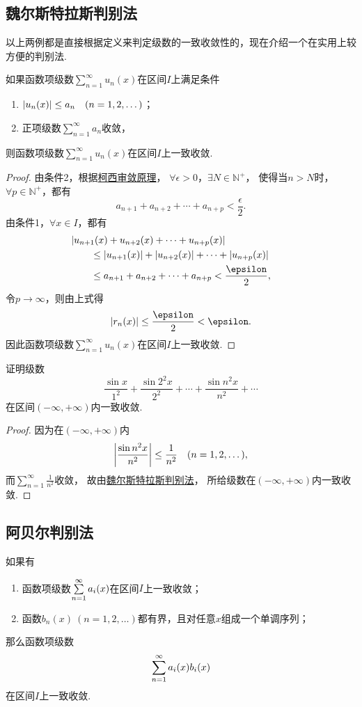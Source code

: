 \subsection{魏尔斯特拉斯判别法}
以上两例都是直接根据定义来判定级数的一致收敛性的，现在介绍一个在实用上较方便的判别法.
\begin{theorem}[魏尔斯特拉斯判别法]\label{theorem:无穷级数.魏尔斯特拉斯判别法}
如果函数项级数\(\sum\limits_{n=1}^\infty u_n(x)\)在区间\(I\)上满足条件\begin{enumerate}
\item \(\abs{u_n(x)} \leq a_n \quad(n=1,2,\dotsc)\)；
\item 正项级数\(\sum\limits_{n=1}^\infty a_n\)收敛，
\end{enumerate}
则函数项级数\(\sum\limits_{n=1}^\infty u_n(x)\)在区间\(I\)上一致收敛.
\begin{proof}
由条件2，根据\hyperref[theorem:无穷级数.级数的柯西审敛原理]{柯西审敛原理}，
\(\forall\epsilon>0\)，\(\exists N \in \mathbb{N}^+\)，
使得当\(n > N\)时，\(\forall p \in \mathbb{N}^+\)，都有\[
a_{n+1} + a_{n+2} + \dotsb + a_{n+p} < \frac{\epsilon}{2}.
\]由条件1，\(\forall x \in I\)，都有\begin{align*}
&\hspace{-20pt}\abs{u_{n+1}(x) + u_{n+2}(x) + \dotsb + u_{n+p}(x)} \\
&\leq \abs{u_{n+1}(x)} + \abs{u_{n+2}(x)} + \dotsb + \abs{u_{n+p}(x)} \\
&\leq a_{n+1} + a_{n+2} + \dotsb + a_{n+p} < \frac{\epsilon}{2},
\end{align*}令\(p\to\infty\)，则由上式得\[
\abs{r_n(x)} \leq \frac{\epsilon}{2} < \epsilon.
\]因此函数项级数\(\sum\limits_{n=1}^\infty u_n(x)\)在区间\(I\)上一致收敛.
\end{proof}
\end{theorem}

\begin{example}
证明级数\[
\frac{\sin x}{1^2}
+ \frac{\sin 2^2 x}{2^2}
+ \dotsb
+ \frac{\sin n^2 x}{n^2}
+ \dotsb
\]在区间\((-\infty,+\infty)\)内一致收敛.
\begin{proof}
因为在\((-\infty,+\infty)\)内\[
\abs{\frac{\sin n^2 x}{n^2}} \leq \frac{1}{n^2}
\quad(n=1,2,\dotsc),
\]而\(\sum\limits_{n=1}^\infty \frac{1}{n^2}\)收敛，
故由\hyperref[theorem:无穷级数.魏尔斯特拉斯判别法]{魏尔斯特拉斯判别法}，
所给级数在\((-\infty,+\infty)\)内一致收敛.
\end{proof}
\end{example}

\subsection{阿贝尔判别法}
\begin{theorem}[阿贝尔判别法]\label{theorem:无穷级数.阿贝尔判别法}
如果有
\begin{enumerate}
\item 函数项级数\(\sum\limits_{n=1}^\infty a_i(x)\)在区间\(I\)上一致收敛；
\item 函数\(b_n(x)\ (n=1,2,\dotsc)\)都有界，且对任意\(x\)组成一个单调序列；
\end{enumerate}
那么函数项级数\[
\sum\limits_{n=1}^\infty a_i(x) b_i(x)
\]
在区间\(I\)上一致收敛.
\end{theorem}

